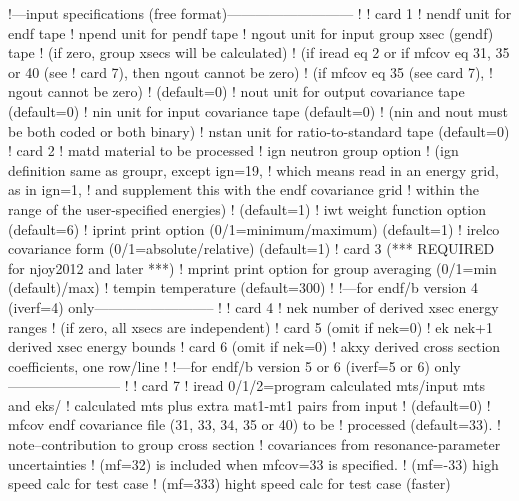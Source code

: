 \newpage
\small
\begin{ccode}

   !---input specifications (free format)---------------------------
   !
   !  card 1
   !    nendf   unit for endf tape
   !    npend   unit for pendf tape
   !    ngout   unit for input group xsec (gendf) tape
   !            (if zero, group xsecs will be calculated)
   !            (if iread eq 2 or if mfcov eq 31, 35 or 40 (see
   !             card 7), then ngout cannot be zero)
   !            (if mfcov eq 35 (see card 7),
   !              ngout cannot be zero)
   !            (default=0)
   !    nout    unit for output covariance tape (default=0)
   !    nin     unit for input covariance tape (default=0)
   !            (nin and nout must be both coded or both binary)
   !    nstan   unit for ratio-to-standard tape (default=0)
   !  card 2
   !    matd    material to be processed
   !    ign     neutron group option
   !            (ign definition same as groupr, except ign=19,
   !            which means read in an energy grid, as in ign=1,
   !            and supplement this with the endf covariance grid
   !            within the range of the user-specified energies)
   !            (default=1)
   !    iwt     weight function option (default=6)
   !    iprint  print option (0/1=minimum/maximum) (default=1)
   !    irelco  covariance form (0/1=absolute/relative) (default=1)
   !  card 3    (*** REQUIRED for njoy2012 and later ***)
   !    mprint  print option for group averaging (0/1=min (default)/max)
   !    tempin  temperature (default=300)
   !
   !---for endf/b version 4 (iverf=4) only--------------------------
   !
   !  card 4
   !    nek     number of derived xsec energy ranges
   !            (if zero, all xsecs are independent)
   !  card 5    (omit if nek=0)
   !    ek      nek+1 derived xsec energy bounds
   !  card 6    (omit if nek=0)
   !    akxy    derived cross section coefficients, one row/line
   !
   !---for endf/b version 5 or 6 (iverf=5 or 6) only------------------------
   !
   !  card 7
   !    iread   0/1/2=program calculated mts/input mts and eks/
   !            calculated mts plus extra mat1-mt1 pairs from input
   !            (default=0)
   !    mfcov   endf covariance file (31, 33, 34, 35 or 40) to be
   !            processed (default=33).
   !            note--contribution to group cross section
   !            covariances from resonance-parameter uncertainties
   !            (mf=32) is included when mfcov=33 is specified.
   !            (mf=-33) high speed calc for test case
   !            (mf=333) hight speed calc for test case (faster)

\end{ccode}
